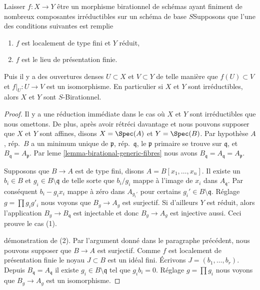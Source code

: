 \begin{lemma}

\label{lemma-birational-birational}

Laisser $f : X \to Y$ être un morphisme birationnel de schémas ayant finiment de nombreux composantes irréductibles sur un schéma de base $S$Supposons que l'une des conditions suivantes est remplie

\begin{enumerate}

\item  $f$ est localement de type fini et $Y$ réduit,
\item  $f$ est le lieu de présentation finie.

\end{enumerate}

Puis il y a des ouvertures denses $U \subset X$ et $V \subset Y$
de telle manière que $f(U) \subset V$ et $f|_U : U \to V$ est un isomorphisme. En particulier si $X$ et $Y$ sont irréductibles, alors
$X$ et $Y$ sont $S$-Birationnel.

\end{lemma}

\begin{proof}
Il y a une réduction immédiate dans le cas où $X$ et $Y$ sont irréductibles que nous omettons. De plus, après avoir rétréci davantage et nous pouvons supposer que $X$ et $Y$ sont affines, disons $X = \Spec(A)$ et $Y = \Spec(B)$. Par hypothèse $A$, rép.\ $B$ a un minimum unique de $\mathfrak p$, rép.\ $\mathfrak q$, le $\mathfrak p$ primaire se trouve sur $\mathfrak q$, et $B_\mathfrak q = A_\mathfrak p$. Par leme \ref{lemma-birational-generic-fibres} nous avons $B_\mathfrak q = A_\mathfrak q = A_\mathfrak p$.

\medskip\noindent
Supposons que $B \to A$ est de type fini, disons $A = B[x_1, \ldots, x_n]$. Il existe un $b_i \in B$ et $g_i \in B \setminus \mathfrak q$ de telle sorte que $b_i/g_i$ mappe à l'image de $x_i$ dans $A_\mathfrak q$. Par conséquent $b_i  - g_ix_i$ mappe à zéro dans $A_{g_i'}$ pour certains $g_i' \in B \setminus \mathfrak q$. Réglage $g = \prod g_i g'_i$ nous voyons que $B_g \to A_g$ est surjectif. Si d'ailleurs $Y$ est réduit, alors l'application $B_g \to B_\mathfrak q$ est injectable et donc $B_g \to A_g$ est injective aussi. Ceci prouve le cas (1).

\medskip\noindent
démonstration de (2). Par l'argument donné dans le paragraphe précédent, nous pouvons supposer que $B \to A$ est surjectif. Comme $f$ est localement de présentation finie le noyau $J \subset B$ est un idéal fini. Écrivons $J = (b_1, \ldots, b_r)$. Depuis $B_\mathfrak q = A_\mathfrak q$ il existe $g_i \in B \setminus \mathfrak q$ tel que $g_i b_i = 0$. Réglage $g = \prod g_i$ nous voyons que $B_g \to A_g$ est un isomorphisme.
\end{proof}

